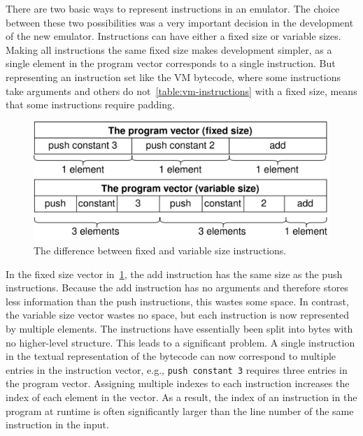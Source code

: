 There are two basic ways to represent instructions in an emulator.
The choice between these two possibilities was a very important decision in the development of the new emulator.
Instructions can have either a fixed size or variable sizes.
Making all instructions the same fixed size makes development simpler, as a single element in the program vector corresponds to a single instruction.
But representing an instruction set like the VM bytecode, where some instructions take arguments and others do not~\ref{table:vm-instructions} with a fixed size, means that some instructions require padding.
\begin{center}
  \begin{figure}[ht]
    \centering
    \includegraphics[width=12cm]{fig/instruction-size.png}
    \caption{The difference between fixed and variable size instructions.}
    \label{fig:instruction-size}
  \end{figure}
\end{center}
In the fixed size vector in~\cref{fig:instruction-size}, the add instruction has the same size as the push instructions.
Because the add instruction has no arguments and therefore stores less information than the push instructions, this wastes some space.
In contrast, the variable size vector wastes no space, but each instruction is now represented by multiple elements.
The instructions have essentially been split into bytes with no higher-level structure.
This leads to a significant problem.
A single instruction in the textual representation of the bytecode can now correspond to multiple entries in the instruction vector, e.g., \verb+push constant 3+ requires three entries in the program vector.
Assigning multiple indexes to each instruction increases the index of each element in the vector.
As a result, the index of an instruction in the program at runtime is often significantly larger than the line number of the same instruction in the input.
